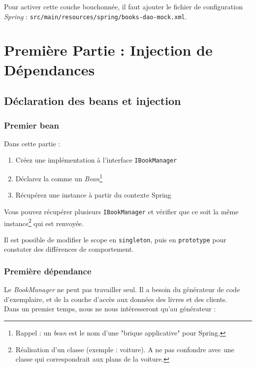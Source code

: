 \documentclass[small,algo]{dushClass}
\begin{document}
Pour activer cette couche bouchonnée, il faut ajouter le fichier de configuration \emph{Spring} : \texttt{src/main/resources/spring/books-dao-mock.xml}.



\section{Première Partie : Injection de Dépendances}


\subsection{Déclaration des beans et injection}

\subsubsection{Premier bean}

Dans cette partie :
\begin{enumerate}
\item Créez une implémentation à l'interface \texttt{IBookManager}
\item Déclarez la comme un \emph{Bean}\footnote{Rappel : un \emph{bean} est le nom d'une "brique applicative" pour Spring.}
\item Récupérez une instance à partir du contexte Spring\\
\end{enumerate}

Vous pouvez récupérer plusieurs \texttt{IBookManager} et vérifier que ce soit la même instance\footnote{Réalisation d'un classe (exemple : voiture). A ne pas confondre avec une classe qui correspondrait aux plans de la voiture.} qui est renvoyée.\par
Il est possible de modifier le scope en \texttt{singleton}, puis en \texttt{prototype} pour constater des différences de comportement.

\subsubsection{Première dépendance}

Le \emph{BookManager} ne peut pas travailler seul. Il a besoin du générateur de code d'exemplaire, et de la couche d'accès aux données des livres et des clients.\\

Dans un premier temps, nous ne nous intéresseront qu'au générateur : 
\end{document}
